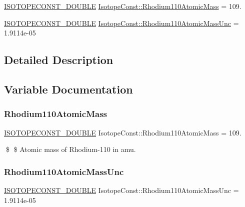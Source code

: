\begin{DoxyCompactItemize}
\item 
\mbox{\hyperlink{group___isotope_const-_macros_ga8f45a7272ce02c0b4c65c44636ed719a}{I\+S\+O\+T\+O\+P\+E\+C\+O\+N\+S\+T\+\_\+\+D\+O\+U\+B\+LE}} \mbox{\hyperlink{group___isotope_const-_rhodium-_rh110_ga55600beef497226dedc697af9ba7c711}{Isotope\+Const\+::\+Rhodium110\+Atomic\+Mass}} = 109.
\item 
\mbox{\hyperlink{group___isotope_const-_macros_ga8f45a7272ce02c0b4c65c44636ed719a}{I\+S\+O\+T\+O\+P\+E\+C\+O\+N\+S\+T\+\_\+\+D\+O\+U\+B\+LE}} \mbox{\hyperlink{group___isotope_const-_rhodium-_rh110_ga3457a310aecf43b7578e484c7231976f}{Isotope\+Const\+::\+Rhodium110\+Atomic\+Mass\+Unc}} = 1.\+9114e-\/05
\end{DoxyCompactItemize}


\subsection{Detailed Description}


\subsection{Variable Documentation}
\mbox{\label{group___isotope_const-_rhodium-_rh110_ga55600beef497226dedc697af9ba7c711}} 
\subsubsection{\texorpdfstring{Rhodium110\+Atomic\+Mass}{Rhodium110AtomicMass}}
{\footnotesize\ttfamily \mbox{\hyperlink{group___isotope_const-_macros_ga8f45a7272ce02c0b4c65c44636ed719a}{I\+S\+O\+T\+O\+P\+E\+C\+O\+N\+S\+T\+\_\+\+D\+O\+U\+B\+LE}} Isotope\+Const\+::\+Rhodium110\+Atomic\+Mass = 109.}

\$ \$ Atomic mass of Rhodium-\/110 in amu. \mbox{\label{group___isotope_const-_rhodium-_rh110_ga3457a310aecf43b7578e484c7231976f}} 
\subsubsection{\texorpdfstring{Rhodium110\+Atomic\+Mass\+Unc}{Rhodium110AtomicMassUnc}}
{\footnotesize\ttfamily \mbox{\hyperlink{group___isotope_const-_macros_ga8f45a7272ce02c0b4c65c44636ed719a}{I\+S\+O\+T\+O\+P\+E\+C\+O\+N\+S\+T\+\_\+\+D\+O\+U\+B\+LE}} Isotope\+Const\+::\+Rhodium110\+Atomic\+Mass\+Unc = 1.\+9114e-\/05}

